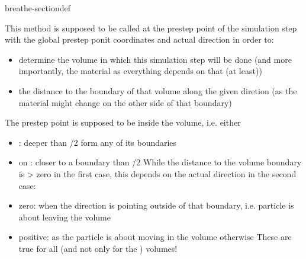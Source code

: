 \documentclass[letterpaper,10pt,english]{sphinxmanual}
\begin{document}
\begin{fulllineitems}
\begin{sphinxuseclass}{breathe-sectiondef}
\begin{fulllineitems}
\sphinxAtStartPar
This method is supposed to be called at the pre\sphinxhyphen{}step point of the simulation step with the global pre\sphinxhyphen{}step ponit coordinates and actual direction in order to:\begin{itemize}
\item {} 
\sphinxAtStartPar
determine the volume in which this simulation step will be done (and more importantly, the material as everything depends on that (at least))

\item {} 
\sphinxAtStartPar
the distance to the boundary of that volume along the given diretion (as the material might change on the other side of that boundary)

\end{itemize}


\sphinxAtStartPar
The pre\sphinxhyphen{}step point is supposed to be inside the  volume, i.e. either\begin{itemize}
\item {} 
\sphinxAtStartPar
{}: deeper than /2 form any of its boundaries

\item {} 
\sphinxAtStartPar
on : closer to a boundary than /2 While the distance to the  volume boundary is \textgreater{} zero in the first case, this depends on the actual direction in the second case:

\item {} 
\sphinxAtStartPar
zero: when the direction is pointing outside of that boundary, i.e. particle is about leaving the volume

\item {} 
\sphinxAtStartPar
positive: as the particle is about moving in the volume otherwise These are true for all (and not only for the ) volumes!

\end{itemize}



\end{fulllineitems}
\end{sphinxuseclass}
\end{fulllineitems}
\end{document}
